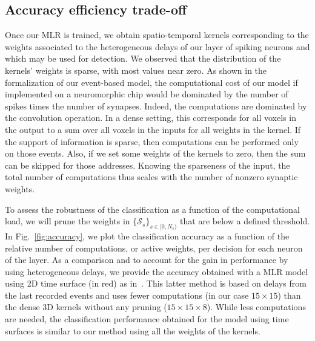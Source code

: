 \documentclass[default]{sn-jnl}%
\theoremstyle{thmstyleone}%
\theoremstyle{thmstyletwo}%
\theoremstyle{thmstylethree}%
\newcommand{\synapse}{\mathcal{S}} %
\newcommand{\ranksyn}{s} %
\newcommand{\Nsyn}{N_{s}} %
\begin{document}
\subsection{Accuracy efficiency trade-off}%
Once our MLR is trained, we obtain spatio-temporal kernels corresponding to the weights associated to the heterogeneous delays of our layer of spiking neurons and which may be used for detection. We observed that the distribution of the kernels' weights is sparse, with most values near zero. As shown in the formalization of our event-based model, the computational cost of our model if implemented on a neuromorphic chip would be dominated by the number of spikes times the number of synapses. Indeed, the computations are dominated by the convolution operation. In a dense setting, this corresponds for all voxels in the output to a sum over all voxels in the inputs for all weights in the kernel. If the support of information is sparse, then computations can be performed only on those events. Also, if we set some weights of the kernels to zero, then the sum can be skipped for those addresses. Knowing the sparseness of the input, the total number of computations thus scales with the number of nonzero synaptic weights. 

To assess the robustness of the classification as a function of the computational load, we will prune the weights in $\{\synapse_\ranksyn\}_{\ranksyn \in [0,\Nsyn)}$ that are below a defined threshold. In Fig.~\ref{fig:accuracy}, we plot the classification accuracy as a function of the relative number of computations, or active weights, per decision for each neuron of the layer. As a comparison and to account for the gain in performance by using heterogeneous delays, we provide the accuracy obtained with a MLR model using 2D time surface (in red) as in~\citep{grimaldi_robust_2022}. This latter method is based on delays from the last recorded events and uses fewer computations (in our case $15\times15$) than the dense 3D kernels without any pruning ($15\times15\times8$). While less computations are needed, the classification performance obtained for the model using time surfaces is similar to our method using all the weights of the kernels.
\end{document}
